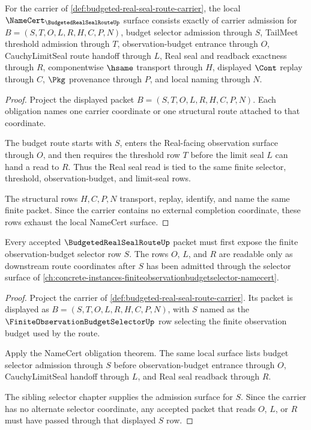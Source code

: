 \begin{theorem}
\label{thm:budgeted-real-seal-route-namecert-obligations}
For the carrier of \autoref{def:budgeted-real-seal-route-carrier}, the local $\NameCert_{\BudgetedRealSealRouteUp}$ surface consists exactly of carrier admission for $B=(S,T,O,L,R,H,C,P,N)$, budget selector admission through $S$, TailMeet threshold admission through $T$, observation-budget entrance through $O$, CauchyLimitSeal route handoff through $L$, Real seal and readback exactness through $R$, componentwise $\hsame$ transport through $H$, displayed $\Cont$ replay through $C$, $\Pkg$ provenance through $P$, and local naming through $N$.
\end{theorem}
\begin{proof}
Project the displayed packet $B=(S,T,O,L,R,H,C,P,N)$. Each obligation names one carrier coordinate or one structural route attached to that coordinate.

The budget route starts with $S$, enters the Real-facing observation surface through $O$, and then requires the threshold row $T$ before the limit seal $L$ can hand a read to $R$. Thus the Real seal read is tied to the same finite selector, threshold, observation-budget, and limit-seal rows.

The structural rows $H,C,P,N$ transport, replay, identify, and name the same finite packet. Since the carrier contains no external completion coordinate, these rows exhaust the local NameCert surface.
\end{proof}

\begin{theorem}
\label{thm:budgeted-real-seal-route-selector-admission}
Every accepted $\BudgetedRealSealRouteUp$ packet must first expose the finite observation-budget selector row $S$. The rows $O$, $L$, and $R$ are readable only as downstream route coordinates after $S$ has been admitted through the selector surface of \autoref{ch:concrete-instances-finiteobservationbudgetselector-namecert}.
\end{theorem}
\begin{proof}
Project the carrier of \autoref{def:budgeted-real-seal-route-carrier}. Its packet is displayed as $B=(S,T,O,L,R,H,C,P,N)$, with $S$ named as the $\FiniteObservationBudgetSelectorUp$ row selecting the finite observation budget used by the route.

Apply the NameCert obligation theorem. The same local surface lists budget selector admission through $S$ before observation-budget entrance through $O$, CauchyLimitSeal handoff through $L$, and Real seal readback through $R$.

The sibling selector chapter supplies the admission surface for $S$. Since the carrier has no alternate selector coordinate, any accepted packet that reads $O$, $L$, or $R$ must have passed through that displayed $S$ row.
\end{proof}

